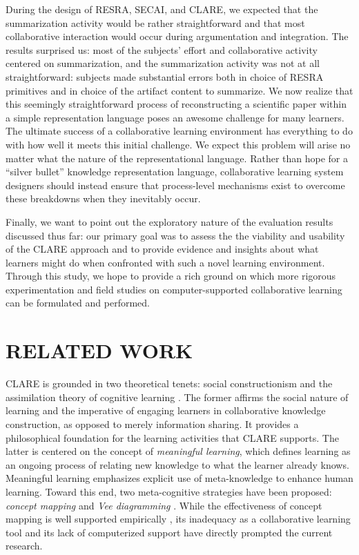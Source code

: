 During the design of RESRA, SECAI, and CLARE, we expected that the
summarization activity would be rather straightforward and that most
collaborative interaction would occur during argumentation and integration.
The results surprised us: most of the subjects' effort and collaborative
activity centered on summarization, and the summarization activity was not
at all straightforward: subjects made substantial errors both in choice of
RESRA primitives and in choice of the artifact content to summarize.  We
now realize that this seemingly straightforward process of reconstructing a
scientific paper within a simple representation language poses an awesome
challenge for many learners.  The ultimate success of a collaborative
learning environment has everything to do with how well it meets this
initial challenge.  We expect this problem will arise no matter what the
nature of the representational language. Rather than hope for a ``silver
bullet'' knowledge representation language, collaborative learning system
designers should instead ensure that process-level mechanisms exist to
overcome these breakdowns when they inevitably occur.

Finally, we want to point out the exploratory nature of the evaluation
results discussed thus far: our primary goal was to assess the the
viability and usability of the CLARE approach and to provide evidence and
insights about what learners might do when confronted with such a novel
learning environment. Through this study, we hope to provide a rich ground
on which more rigorous experimentation and field studies on
computer-supported collaborative learning can be formulated and performed.


\section{RELATED WORK}
\label{sec:related work}

CLARE is grounded in two theoretical tenets: social constructionism
\cite{Berger66,Knorr-Cetina81} and the assimilation theory of cognitive
learning \cite{Ausubel63,Novak84}. The former affirms the social nature of
learning and the imperative of engaging learners in collaborative knowledge
construction, as opposed to merely information sharing. It provides a
philosophical foundation for the learning activities that CLARE
supports. The latter is centered on the concept of {\it meaningful
learning\/}, which defines learning as an ongoing process of relating new
knowledge to what the learner already knows. Meaningful learning emphasizes
explicit use of meta-knowledge to enhance human learning. Toward this end,
two meta-cognitive strategies have been proposed: {\it concept mapping\/}
and {\it Vee diagramming\/} \cite{Gowin81,Novak84}. While the effectiveness
of concept mapping is well supported empirically
\cite{Cliburn90,Novak90,Roth92}, its inadequacy as a collaborative learning
tool and its lack of computerized support have directly prompted the
current research.

